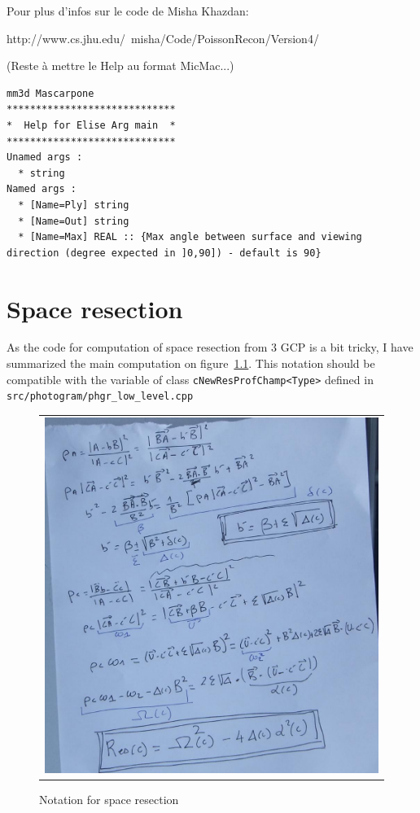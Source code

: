 Pour plus d'infos sur le code de Misha Khazdan:

http://www.cs.jhu.edu/~misha/Code/PoissonRecon/Version4/
	
\vspace{\baselineskip}
(Reste à mettre le Help au format MicMac...)

\begin{verbatim} 
mm3d Mascarpone
*****************************
*  Help for Elise Arg main  *
*****************************
Unamed args :
  * string
Named args :
  * [Name=Ply] string
  * [Name=Out] string
  * [Name=Max] REAL :: {Max angle between surface and viewing direction (degree expected in ]0,90]) - default is 90}
\end{verbatim}


\chapter{Space resection}

As the code for computation of space resection from $3$ GCP is a bit tricky, I have summarized the main
computation on figure~\ref{Not:ResSpace}. This notation should be compatible with the variable 
of class {\tt cNewResProfChamp<Type>} defined in {\tt src/photogram/phgr\_low\_level.cpp}


\begin{figure}
\begin{tabular}{|c|}
   \hline \hline
   \includegraphics[width=160mm]{FIGS/Formules/NotattionSpace.JPG}
\end{tabular}
\label{Not:ResSpace}
\caption{Notation for space resection}
\end{figure}






